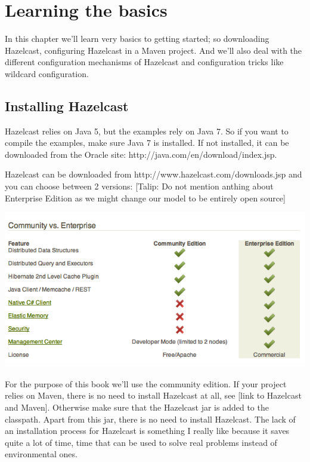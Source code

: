 \chapter{Learning the basics}
In this chapter we'll learn very basics to getting started; so downloading Hazelcast, configuring Hazelcast in a Maven project. And we'll also deal with the different configuration mechanisms of Hazelcast and configuration tricks like wildcard configuration.

\section{Installing Hazelcast}
Hazelcast relies on Java 5, but the examples rely on Java 7. So if you want to compile the examples, make sure Java 7 is installed. If not installed, it can be downloaded from the Oracle site: http://java.com/en/download/index.jsp.

Hazelcast can be downloaded from http://www.hazelcast.com/downloads.jsp and you can choose between 2 versions:
[Talip: Do not mention anthing about Enterprise Edition as we might change our model to be entirely open source]

\includegraphics[scale=0.60]{hazelcast-editions.png}

For the purpose of this book we'll use the community edition. If your project relies on Maven, there is no need to install Hazelcast at all, see [link to Hazelcast and Maven]. Otherwise make sure that the Hazelcast jar is added to the classpath. Apart from this jar, there is no need to install Hazelcast.  The lack of an installation process for Hazelcast is something I really like because it saves quite a lot of time, time that can be used to solve real problems instead of environmental ones.

